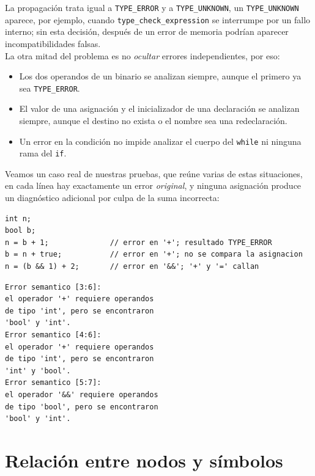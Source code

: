 \documentclass[12pt,letterpaper]{article}
\begin{document}
La propagación trata igual a \texttt{TYPE\_ERROR} y a \texttt{TYPE\_UNKNOWN}, un \texttt{TYPE\_UNKNOWN} aparece,
por ejemplo, cuando \texttt{type\_check\_expression} se interrumpe por un fallo interno; sin esta decisión,
después de un error de memoria podrían aparecer incompatibilidades falsas.\\

La otra mitad del problema es no \emph{ocultar} errores independientes, por eso:

\begin{itemize}
\item Los dos operandos de un binario se analizan siempre, aunque el primero ya sea \texttt{TYPE\_ERROR}.
\item El valor de una asignación y el inicializador de una declaración se analizan siempre, aunque el destino no
  exista o el nombre sea una redeclaración.
\item Un error en la condición no impide analizar el cuerpo del \texttt{while} ni ninguna rama del \texttt{if}.
\end{itemize}

Veamos un caso real de nuestras pruebas, que reúne varias de estas situaciones, en cada línea hay exactamente un
error \emph{original}, y ninguna asignación produce un diagnóstico adicional por culpa de la suma incorrecta:

\begin{verbatim}
int n;
bool b;
n = b + 1;              // error en '+'; resultado TYPE_ERROR
b = n + true;           // error en '+'; no se compara la asignacion
n = (b && 1) + 2;       // error en '&&'; '+' y '=' callan
\end{verbatim}

\begin{verbatim}
Error semantico [3:6]:
el operador '+' requiere operandos
de tipo 'int', pero se encontraron
'bool' y 'int'.
Error semantico [4:6]:
el operador '+' requiere operandos
de tipo 'int', pero se encontraron
'int' y 'bool'.
Error semantico [5:7]:
el operador '&&' requiere operandos
de tipo 'bool', pero se encontraron
'bool' y 'int'.
\end{verbatim}

\section*{Relación entre nodos y símbolos}
\end{document}
